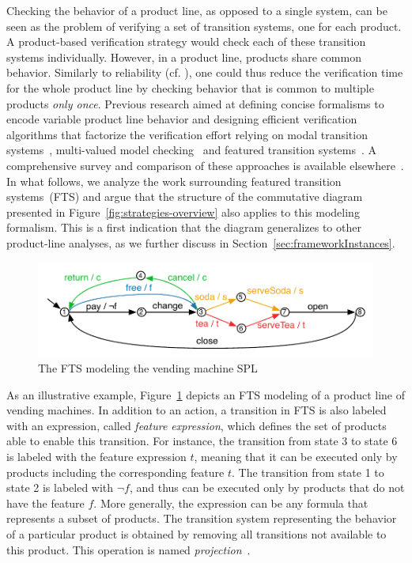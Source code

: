 
Checking the behavior of a product line, as opposed to a single system, can be seen as the problem of verifying a set of transition systems, one for each product. A product-based verification strategy would check each of these transition systems  individually. However, in a product line, products share common behavior. Similarly to reliability  (cf. ), one could thus reduce the verification time for the whole product line by checking behavior that is common to multiple products \emph{only once}. Previous research aimed at defining concise formalisms to encode variable product line behavior  and designing efficient verification algorithms that factorize the verification effort relying on modal transition systems~\cite{Huth2001,Fischbein2006}, multi-valued model checking~\cite{Chechik2001} and featured transition systems~\cite{Classen2013}. 
A comprehensive survey and comparison of these approaches is available elsewhere~\cite{Thum2014,TerBeek2015,Cordy2019,TerBeek2019,Varshosaz2019}. In what follows, we analyze the work surrounding featured transition systems~(FTS) and argue that the structure of the commutative diagram presented in Figure~\ref{fig:strategies-overview} also applies to this modeling formalism. This is a first indication that the diagram generalizes to other product-line  analyses, as we further discuss in Section~\ref{sec:frameworkInstances}.

\begin{figure}[t]
	\centering
    \includegraphics[width = 0.9\linewidth]{figures/fts.pdf}
	\caption{The FTS modeling the vending machine SPL}
	\label{fig:fts-vendingmachine}
\end{figure}

As an illustrative example, Figure~\ref{fig:fts-vendingmachine} depicts an FTS modeling of a product line of vending machines. In addition to an action, a transition in FTS is also labeled with an expression, called \emph{feature expression}, which defines the set of products able to enable this transition. For instance, the transition from state 3 to state 6 is labeled with the feature expression $t$, meaning that it can be executed only by products including the corresponding feature $t$. The transition from state 1 to state 2 is labeled with $\lnot f$, and thus can be executed only by products that do not have the feature $f$. More generally, the expression can be any formula that represents a subset of  products. The transition system representing the behavior  of a particular product is obtained by removing all transitions not available to this product. This operation is named \emph{projection}~\cite{Classen2013}.


